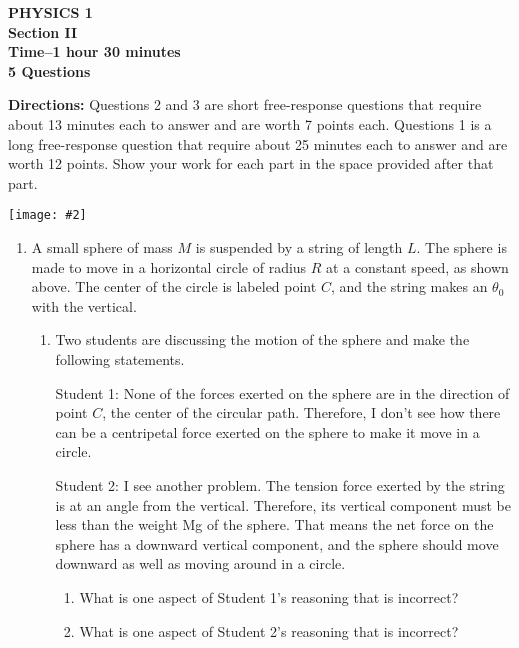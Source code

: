 \documentclass[11pt]{article}
\newcommand{\pic}[2]{
  \begin{center}\texttt{[image: \#2]}\end{center}
}
\begin{document}
\begin{center}
  \textbf{PHYSICS 1\\
    Section II\\
    Time--1 hour 30 minutes\\
    5 Questions
  }
\end{center}

\textbf{Directions:} Questions 2 and 3 are short free-response questions
that require about 13 minutes each to answer and are worth 7 points each.
Questions 1 is a long free-response question that require about 25
minutes each to answer and are worth 12 points. Show your work for each
part in the space provided after that part.

\pic{.4}{swing-around}
\begin{enumerate}[leftmargin=18pt]
\item A small sphere of mass $M$ is suspended by a string of length $L$. The
  sphere is made to move in a horizontal circle of radius $R$ at a constant
  speed, as shown above. The center of the circle is labeled point $C$, and the
  string makes an $\theta_0$ with the vertical.
  \begin{enumerate}[leftmargin=18pt]
  \item Two students are discussing the motion of the sphere and make the
    following statements.
    
    \vspace{.1in}Student 1: None of the forces exerted on the sphere are in the
    direction of point $C$, the center of the circular path. Therefore, I don't
    see how there can be a centripetal force exerted on the sphere to make it
    move in a circle.

    \vspace{.1in}Student 2: I see another problem. The tension force exerted by
    the string is at an angle from the vertical. Therefore, its vertical
    component must be less than the weight Mg of the sphere. That means the net
    force on the sphere has a downward vertical component, and the sphere
    should move downward as well as moving around in a circle.

    \vspace{.1in}\begin{enumerate}[leftmargin=18pt]
    \item What is one aspect of Student 1's reasoning that is incorrect?
    \item What is one aspect of Student 2's reasoning that is incorrect?
    \end{enumerate}
    

\end{enumerate}
\end{enumerate}
\end{document}

